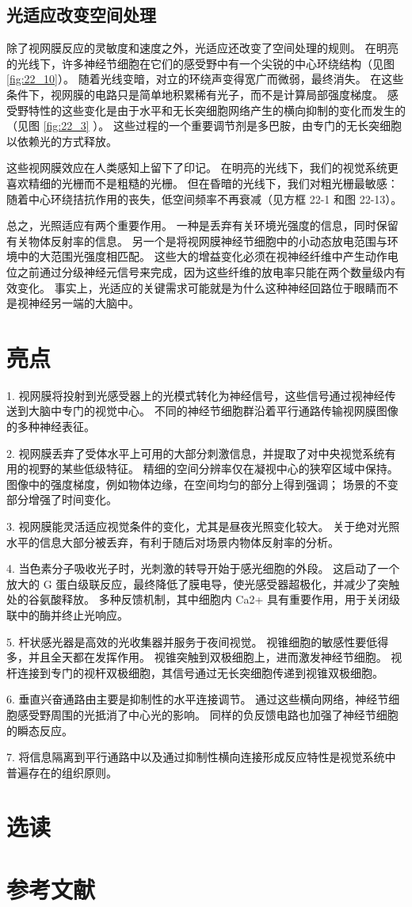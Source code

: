 \subsection{光适应改变空间处理}

除了视网膜反应的灵敏度和速度之外，光适应还改变了空间处理的规则。 在明亮的光线下，许多神经节细胞在它们的感受野中有一个尖锐的中心环绕结构（见图 \ref{fig:22_10}）。 随着光线变暗，对立的环绕声变得宽广而微弱，最终消失。 在这些条件下，视网膜的电路只是简单地积累稀有光子，而不是计算局部强度梯度。 感受野特性的这些变化是由于水平和无长突细胞网络产生的横向抑制的变化而发生的（见图 \ref{fig:22_3} ）。 这些过程的一个重要调节剂是多巴胺，由专门的无长突细胞以依赖光的方式释放。

这些视网膜效应在人类感知上留下了印记。 在明亮的光线下，我们的视觉系统更喜欢精细的光栅而不是粗糙的光栅。 但在昏暗的光线下，我们对粗光栅最敏感：随着中心环绕拮抗作用的丧失，低空间频率不再衰减（见方框 22-1 和图 22-13）。

总之，光照适应有两个重要作用。 一种是丢弃有关环境光强度的信息，同时保留有关物体反射率的信息。 另一个是将视网膜神经节细胞中的小动态放电范围与环境中的大范围光强度相匹配。 这些大的增益变化必须在视神经纤维中产生动作电位之前通过分级神经元信号来完成，因为这些纤维的放电率只能在两个数量级内有效变化。 事实上，光适应的关键需求可能就是为什么这种神经回路位于眼睛而不是视神经另一端的大脑中。

\section{亮点}

1. 视网膜将投射到光感受器上的光模式转化为神经信号，这些信号通过视神经传送到大脑中专门的视觉中心。 不同的神经节细胞群沿着平行通路传输视网膜图像的多种神经表征。 

2. 视网膜丢弃了受体水平上可用的大部分刺激信息，并提取了对中央视觉系统有用的视野的某些低级特征。 精细的空间分辨率仅在凝视中心的狭窄区域中保持。 图像中的强度梯度，例如物体边缘，在空间均匀的部分上得到强调； 场景的不变部分增强了时间变化。 

3. 视网膜能灵活适应视觉条件的变化，尤其是昼夜光照变化较大。 关于绝对光照水平的信息大部分被丢弃，有利于随后对场景内物体反射率的分析。 

4. 当色素分子吸收光子时，光刺激的转导开始于感光细胞的外段。 这启动了一个放大的 G 蛋白级联反应，最终降低了膜电导，使光感受器超极化，并减少了突触处的谷氨酸释放。 多种反馈机制，其中细胞内 Ca2+ 具有重要作用，用于关闭级联中的酶并终止光响应。 

5. 杆状感光器是高效的光收集器并服务于夜间视觉。 视锥细胞的敏感性要低得多，并且全天都在发挥作用。 视锥突触到双极细胞上，进而激发神经节细胞。 视杆连接到专门的视杆双极细胞，其信号通过无长突细胞传递到视锥双极细胞。 

6. 垂直兴奋通路由主要是抑制性的水平连接调节。 通过这些横向网络，神经节细胞感受野周围的光抵消了中心光的影响。 同样的负反馈电路也加强了神经节细胞的瞬态反应。 

7. 将信息隔离到平行通路中以及通过抑制性横向连接形成反应特性是视觉系统中普遍存在的组织原则。


\section{选读}
\section{参考文献}